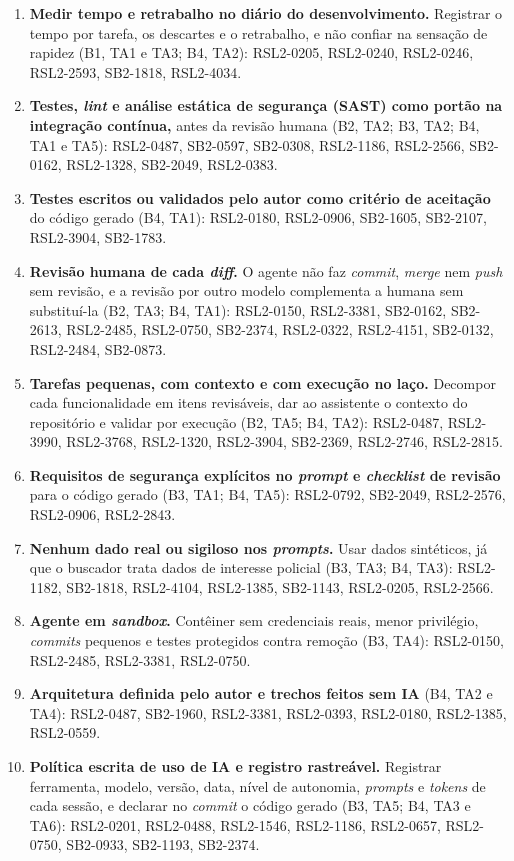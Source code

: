 \begin{enumerate}
	\item \textbf{Medir tempo e retrabalho no diário do desenvolvimento.}
	Registrar o tempo por tarefa, os descartes e o retrabalho, e não confiar
	na sensação de rapidez (B1, TA1 e TA3; B4, TA2): RSL2-0205, RSL2-0240,
	RSL2-0246, RSL2-2593, SB2-1818, RSL2-4034.
	\item \textbf{Testes, \textit{lint} e análise estática de segurança
	(SAST) como portão na integração contínua,} antes da revisão humana (B2,
	TA2; B3, TA2; B4, TA1 e TA5): RSL2-0487, SB2-0597, SB2-0308, RSL2-1186,
	RSL2-2566, SB2-0162, RSL2-1328, SB2-2049, RSL2-0383.
	\item \textbf{Testes escritos ou validados pelo autor como critério de
	aceitação} do código gerado (B4, TA1): RSL2-0180, RSL2-0906, SB2-1605,
	SB2-2107, RSL2-3904, SB2-1783.
	\item \textbf{Revisão humana de cada \textit{diff}.} O agente não faz
	\textit{commit}, \textit{merge} nem \textit{push} sem revisão, e a
	revisão por outro modelo complementa a humana sem substituí-la (B2, TA3;
	B4, TA1): RSL2-0150, RSL2-3381, SB2-0162, SB2-2613, RSL2-2485, RSL2-0750,
	SB2-2374, RSL2-0322, RSL2-4151, SB2-0132, RSL2-2484, SB2-0873.
	\item \textbf{Tarefas pequenas, com contexto e com execução no laço.}
	Decompor cada funcionalidade em itens revisáveis, dar ao assistente o
	contexto do repositório e validar por execução (B2, TA5; B4, TA2):
	RSL2-0487, RSL2-3990, RSL2-3768, RSL2-1320, RSL2-3904, SB2-2369,
	RSL2-2746, RSL2-2815.
	\item \textbf{Requisitos de segurança explícitos no \textit{prompt} e
	\textit{checklist} de revisão} para o código gerado (B3, TA1; B4, TA5):
	RSL2-0792, SB2-2049, RSL2-2576, RSL2-0906, RSL2-2843.
	\item \textbf{Nenhum dado real ou sigiloso nos \textit{prompts}.} Usar
	dados sintéticos, já que o buscador trata dados de interesse policial
	(B3, TA3; B4, TA3): RSL2-1182, SB2-1818, RSL2-4104, RSL2-1385, SB2-1143,
	RSL2-0205, RSL2-2566.
	\item \textbf{Agente em \textit{sandbox}.} Contêiner sem credenciais
	reais, menor privilégio, \textit{commits} pequenos e testes protegidos
	contra remoção (B3, TA4): RSL2-0150, RSL2-2485, RSL2-3381, RSL2-0750.
	\item \textbf{Arquitetura definida pelo autor e trechos feitos sem IA}
	(B4, TA2 e TA4): RSL2-0487, SB2-1960, RSL2-3381, RSL2-0393, RSL2-0180,
	RSL2-1385, RSL2-0559.
	\item \textbf{Política escrita de uso de IA e registro rastreável.}
	Registrar ferramenta, modelo, versão, data, nível de autonomia,
	\textit{prompts} e \textit{tokens} de cada sessão, e declarar no
	\textit{commit} o código gerado (B3, TA5; B4, TA3 e TA6): RSL2-0201,
	RSL2-0488, RSL2-1546, RSL2-1186, RSL2-0657, RSL2-0750, SB2-0933,
	SB2-1193, SB2-2374.
\end{enumerate}
